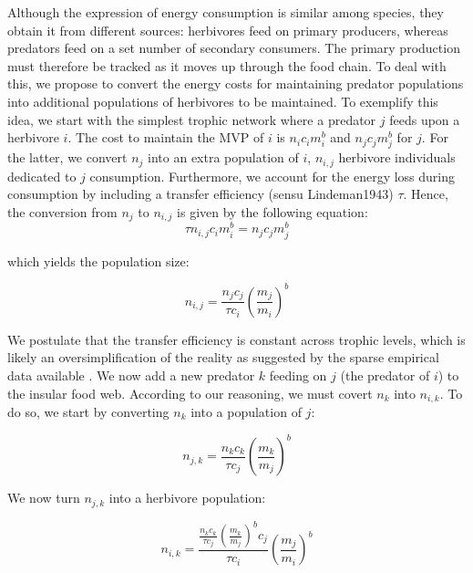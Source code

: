 Although the expression of energy consumption is similar among species,
they obtain it from different sources: herbivores feed on primary
producers, whereas predators feed on a set number of secondary
consumers. The primary production must therefore be tracked as it moves
up through the food chain. To deal with this, we propose to convert the
energy costs for maintaining predator populations into additional
populations of herbivores to be maintained. To exemplify this idea, we
start with the simplest trophic network where a predator \(j\) feeds
upon a herbivore \(i\). The cost to maintain the MVP of \(i\) is
\(n_ic_im_i^b\) and \(n_jc_jm_j^b\) for \(j\). For the latter, we
convert \(n_j\) into an extra population of \(i\), \(n_{i,j}\) herbivore
individuals dedicated to \(j\) consumption. Furthermore, we account for
the energy loss during consumption by including a transfer efficiency
(sensu Lindeman1943) \(\tau\). Hence, the conversion from \(n_{j}\) to
\(n_{i,j}\) is given by the following equation:
\begin{equation} \tau n_{i,j} c_im_i^b = n_jc_jm_j^b \label{eq:id1}\end{equation}

which yields the population size:

\begin{equation} n_{i,j} = \frac{n_jc_j}{\tau c_i} \left( \frac{m_j}{m_i} \right)^b \label{eq:id2}\end{equation}

We postulate that the transfer efficiency is constant across trophic
levels, which is likely an oversimplification of the reality as
suggested by the sparse empirical data available
\citep{Trebilco2013, Brown2003}. We now add a new predator \(k\) feeding
on \(j\) (the predator of \(i\)) to the insular food web. According to
our reasoning, we must covert \(n_k\) into \(n_{i,k}\). To do so, we
start by converting \(n_k\) into a population of \(j\):

\begin{equation} n_{j,k} = \frac{n_kc_k}{\tau c_j} \left( \frac{m_k}{m_j} \right)^b \label{eq:id2}\end{equation}

We now turn \(n_{j,k}\) into a herbivore population:

\begin{equation} n_{i,k} = \frac{\frac{n_kc_k}{\tau c_j} \left( \frac{m_k}{m_j} \right)^bc_j}{\tau c_i} \left( \frac{m_j}{m_i} \right)^b \label{eq:id3}\end{equation}

